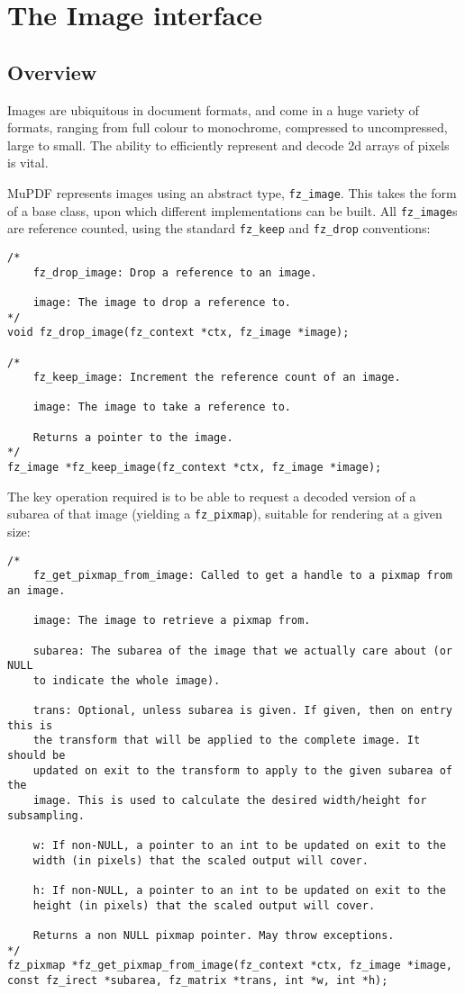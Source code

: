 \documentclass[oneside]{book}
\begin{document}
\chapter{The Image interface}
\label{Image}

\section{Overview}

Images are ubiquitous in document formats, and come in a huge variety of formats, ranging from full colour to monochrome, compressed to uncompressed, large to small. The ability to efficiently represent and decode 2d arrays of pixels is vital.

MuPDF represents images using an abstract type, \texttt{fz\_image}. This takes the form of a base class, upon which different implementations can be built. All \texttt{fz\_image}s are reference counted, using the standard \texttt{fz\_keep} and \texttt{fz\_drop} conventions:

\begin{lstlisting}
/*
	fz_drop_image: Drop a reference to an image.

	image: The image to drop a reference to.
*/
void fz_drop_image(fz_context *ctx, fz_image *image);

/*
	fz_keep_image: Increment the reference count of an image.

	image: The image to take a reference to.

	Returns a pointer to the image.
*/
fz_image *fz_keep_image(fz_context *ctx, fz_image *image);
\end{lstlisting}

The key operation required is to be able to request a decoded version of a subarea of that image (yielding a \texttt{fz\_pixmap}), suitable for rendering at a given size:

\begin{lstlisting}
/*
	fz_get_pixmap_from_image: Called to get a handle to a pixmap from an image.

	image: The image to retrieve a pixmap from.

	subarea: The subarea of the image that we actually care about (or NULL
	to indicate the whole image).

	trans: Optional, unless subarea is given. If given, then on entry this is
	the transform that will be applied to the complete image. It should be
	updated on exit to the transform to apply to the given subarea of the
	image. This is used to calculate the desired width/height for subsampling.

	w: If non-NULL, a pointer to an int to be updated on exit to the
	width (in pixels) that the scaled output will cover.

	h: If non-NULL, a pointer to an int to be updated on exit to the
	height (in pixels) that the scaled output will cover.

	Returns a non NULL pixmap pointer. May throw exceptions.
*/
fz_pixmap *fz_get_pixmap_from_image(fz_context *ctx, fz_image *image, const fz_irect *subarea, fz_matrix *trans, int *w, int *h);
\end{lstlisting}
\end{document}
